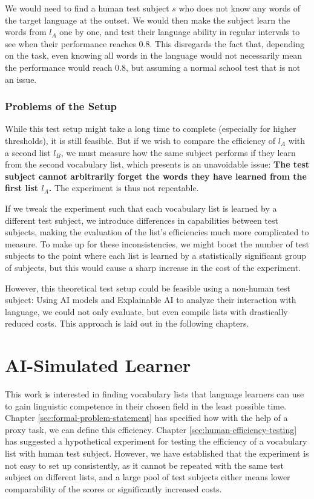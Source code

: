 We would need to find a human test subject $s$ who does not know any words of the target language at the outset.
We would then make the subject learn the words from $l_A$ one by one, and test their language ability in regular intervals to see when their performance reaches $0.8$.
This disregards the fact that, depending on the task, even knowing all words in the language would not necessarily mean the performance would reach 0.8, but assuming a normal school test that is not an issue.

\subsubsection{Problems of the Setup}
While this test setup might take a long time to complete (especially for higher thresholds), it is still feasible.
But if we wish to compare the efficiency of $l_A$ with a second list $l_B$, we must measure how the same subject performs if they learn from the second vocabulary list, which presents is an unavoidable issue:
\textbf{The test subject cannot arbitrarily forget the words they have learned from the first list $l_A$.}
The experiment is thus not repeatable.

If we tweak the experiment such that each vocabulary list is learned by a different test subject, we introduce differences in capabilities between test subjects, making the evaluation of the list's efficiencies much more complicated to measure.
To make up for these inconsistencies, we might boost the number of test subjects to the point where each list is learned by a statistically significant group of subjects, but this would cause a sharp increase in the cost of the experiment.

However, this theoretical test setup could be feasible using a non-human test subject:
Using AI models and Explainable AI to analyze their interaction with language, we could not only evaluate, but even compile lists with drastically reduced costs.
This approach is laid out in the following chapters.

\section{AI-Simulated Learner} \label{sec:ai-simulated-learner}

This work is interested in finding vocabulary lists that language learners can use to gain linguistic competence in their chosen field in the least possible time.
Chapter \ref{sec:formal-problem-statement} has specified how with the help of a proxy task, we can define this efficiency.
Chapter \ref{sec:human-efficiency-testing} has suggested a hypothetical experiment for testing the efficiency of a vocabulary list with human test subject.
However, we have established that the experiment is not easy to set up consistently, as it cannot be repeated with the same test subject on different lists, and a large pool of test subjects either means lower comparability of the scores or significantly increased costs.

